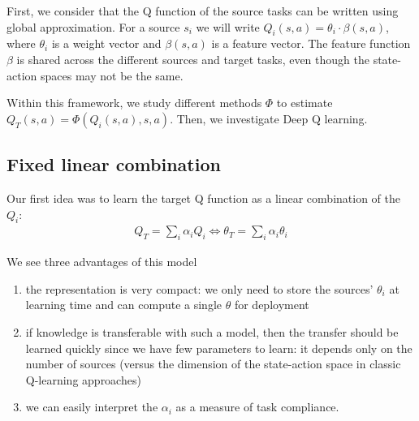 \documentclass{article}
\begin{document}


First, we consider that the Q function of the source tasks can be written using global approximation. For a source $ s_i $ we will write $Q_{i}(s,a) = \theta_i \cdot \beta(s,a)$, where $\theta_i$ is a weight vector and $\beta(s,a)$ is a feature vector. The feature function $ \beta $ is shared across the different sources and target tasks, even though the state-action spaces may not be the same. 

Within this framework, we study different methods $\Phi$ to estimate $Q_{T}(s,a) = \Phi(Q_i(s,a), s, a) $. Then, we investigate Deep Q learning.


\subsection{Fixed linear combination}
Our first idea was to learn the target Q function as a linear combination of the $Q_i$:
\begin{align}
Q_{T} = \sum_{i} \alpha_i Q_i \iff \theta_{T} = \sum_i \alpha_i \theta_i
\end{align}

We see three advantages of this model
\begin{enumerate}
\item the representation is very compact: we only need to store the sources' $\theta_i$ at learning time and can compute a single $\theta$ for deployment
\item if knowledge is transferable with such a model, then the transfer should be learned quickly since we have few parameters to learn: it depends only on the number of sources (versus the dimension of the state-action space in classic Q-learning approaches)
\item we can easily interpret the $ \alpha_i $ as a measure of task compliance.
\end{enumerate}
\end{document}
